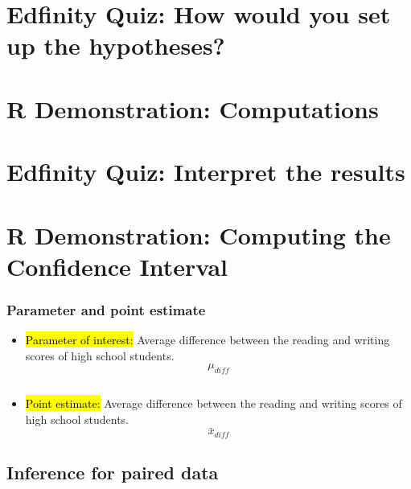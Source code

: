 \documentclass[slidestop,compress,mathserif]{beamer}
\begin{document}

\section{Edfinity Quiz: How would you set up the hypotheses?}  %


\section{R Demonstration: Computations}  %


\section{Edfinity Quiz: Interpret the results}  %


\section{R Demonstration: Computing the Confidence Interval} 


\begin{frame}
\frametitle{Parameter and point estimate}

\begin{itemize}

\item \hl{Parameter of interest:} Average difference between the reading and writing scores of  high school students.
\[ \mu_{diff} \]

$\:$ \\

\pause

\item \hl{Point estimate:} Average difference between the reading and writing scores of  high school students.
\[ \bar{x}_{diff} \]

\end{itemize}

\end{frame}


\subsection{Inference for paired data}
\end{document}
